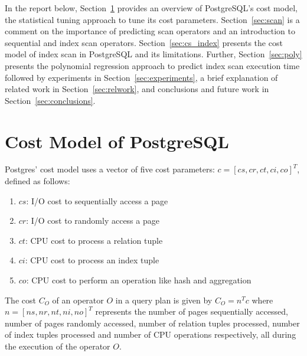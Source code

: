 \documentclass{article}
\begin{document}
\begin{multicols}{2}
	In the report below, Section~\ref{sec:postgres} provides an overview of PostgreSQL's cost model, the statistical tuning approach to tune its cost parameters. Section~\ref{sec:scan} is a comment on the importance of predicting scan operators and an introduction to sequential and index scan operators. Section~\ref{sec:cs_index} presents the cost model of index scan in PostgreSQL and its limitations. Further, Section~\ref{sec:poly} presents the polynomial regression approach to predict index scan execution time followed by experiments in Section~\ref{sec:experiments}, a brief explanation of related work in Section~\ref{sec:relwork}, and conclusions and future work in Section~\ref{sec:conclusions}.
	
	\section{Cost Model of PostgreSQL}
	\label{sec:postgres}
	Postgres’ cost model uses a vector of five cost parameters: $c = [cs,cr,ct,ci,co]^{T}$, defined as follows:
	\begin{enumerate}
	\item $cs$: I/O cost to sequentially access a page
	\item $cr$: I/O cost to randomly access a page
	\item $ct$: CPU cost to process a relation tuple
	\item $ci$: CPU cost to process an index tuple
	\item $co$: CPU cost to perform an operation like hash and aggregation
	\end{enumerate}
	
	The cost $C_{O}$ of an operator $O$ in a query plan is given by $C_{O} = n^{T}c$ where $n = [ns,nr,nt,ni,no]^{T}$ represents the number of pages sequentially accessed, number of pages randomly accessed, number of relation tuples processed, number of index tuples processed and number of CPU operations respectively, all during the execution of the operator $O$.
	

\end{multicols}
\end{document}
